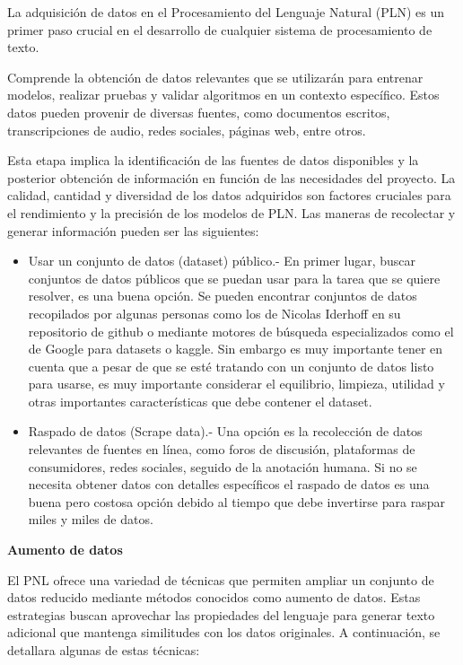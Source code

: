 La adquisición de datos en el Procesamiento del Lenguaje Natural (PLN) es un primer paso crucial en el desarrollo de cualquier sistema de procesamiento de texto.

Comprende la obtención de datos relevantes que se utilizarán para entrenar modelos, realizar pruebas y validar algoritmos en un contexto específico. Estos datos pueden provenir de diversas fuentes, como documentos escritos, transcripciones de audio, redes sociales, páginas web, entre otros.

Esta etapa implica la identificación de las fuentes de datos disponibles y la posterior obtención  de información en función de las necesidades del proyecto. La calidad, cantidad y diversidad de los datos adquiridos son factores cruciales para el rendimiento y la precisión de los modelos de PLN.  Las maneras de recolectar y generar información pueden ser las siguientes:

\begin{itemize}

	\item Usar un conjunto de datos (dataset)  público.- En primer lugar, buscar conjuntos de datos públicos que se puedan usar para la tarea que se quiere resolver, es una buena opción. Se pueden encontrar conjuntos de datos recopilados por algunas personas como los de Nicolas Iderhoff en su repositorio de github o mediante motores de búsqueda especializados como el de Google para datasets o kaggle. Sin embargo es muy importante tener en cuenta que a pesar de que se esté tratando con un conjunto de datos listo para usarse, es muy importante considerar el equilibrio, limpieza, utilidad y otras importantes características que debe contener el dataset.
	
	\item Raspado de datos (Scrape data).-  Una opción es la recolección de datos relevantes de fuentes en línea, como foros de discusión, plataformas de consumidores, redes sociales, seguido de la anotación humana. Si no se necesita obtener datos con detalles específicos el raspado de datos es una buena pero costosa opción debido al tiempo que debe invertirse para raspar miles y miles de datos.

\end{itemize}


\textbf{Aumento de datos}

El PNL ofrece una variedad de técnicas que permiten ampliar un conjunto de datos reducido mediante métodos conocidos como aumento de datos. Estas estrategias buscan aprovechar las propiedades del lenguaje para generar texto adicional que mantenga similitudes con los datos originales. A continuación, se detallara algunas de estas técnicas:

